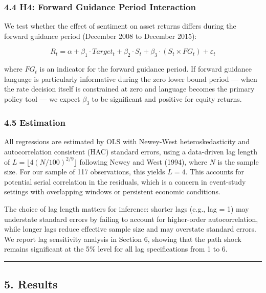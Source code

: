 \documentclass[
]{article}
\begin{document}
\subsubsection{4.4 H4: Forward Guidance Period
Interaction}\label{h4-forward-guidance-period-interaction}

We test whether the effect of sentiment on asset returns differs during
the forward guidance period (December 2008 to December 2015):

\[R_t = \alpha + \beta_1 \cdot Target_t + \beta_2 \cdot S_t + \beta_3 \cdot (S_t \times FG_t) + \varepsilon_t\]

where \(FG_t\) is an indicator for the forward guidance period. If
forward guidance language is particularly informative during the zero
lower bound period --- when the rate decision itself is constrained at
zero and language becomes the primary policy tool --- we expect
\(\beta_3\) to be significant and positive for equity returns.

\subsubsection{4.5 Estimation}\label{estimation}

All regressions are estimated by OLS with Newey-West heteroskedasticity
and autocorrelation consistent (HAC) standard errors, using a
data-driven lag length of \(L = \lfloor 4(N/100)^{2/9} \rfloor\)
following Newey and West (1994), where \(N\) is the sample size. For our
sample of 117 observations, this yields \(L = 4\). This accounts for
potential serial correlation in the residuals, which is a concern in
event-study settings with overlapping windows or persistent economic
conditions.

The choice of lag length matters for inference: shorter lags (e.g., lag
= 1) may understate standard errors by failing to account for
higher-order autocorrelation, while longer lags reduce effective sample
size and may overstate standard errors. We report lag sensitivity
analysis in Section 6, showing that the path shock remains significant
at the 5\% level for all lag specifications from 1 to 6.

\begin{center}\rule{0.5\linewidth}{0.5pt}\end{center}

\subsection{5. Results}\label{results}
\end{document}
